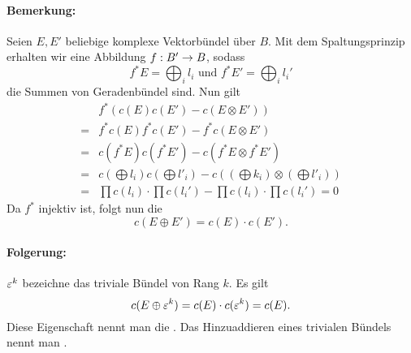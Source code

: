 \paragraph{Bemerkung:}
Seien $E,E'$ beliebige komplexe Vektorbündel über $B$. Mit dem Spaltungsprinzip erhalten wir eine Abbildung $f : B' \overset{}{\rightarrow} B$, sodass
\[ f^* E = \bigoplus_i l_i \text{ und } f^* E' = \bigoplus_i l_i'  \]
die Summen von Geradenbündel sind. Nun gilt
\begin{align*}
&f^*(
c(E) c(E') - c(E \otimes E')
)\\
=& f^*c(E) f^*c(E') - f^*c(E\otimes E')\\
=& c(f^*E) c(f^*E') - c(f^*E \otimes f^*E')\\
=&c(\bigoplus l_i) c(\bigoplus l'_i) - c((\bigoplus k_i) \otimes (\bigoplus l'_i))\\
=& \prod c(l_i) \cdot \prod c(l_i') - \prod c(l_i) \cdot \prod c(l_i') = 0
\end{align*}
Da $f^*$ injektiv ist, folgt nun die 
\[ c(E\oplus E') = c(E) \cdot c(E'). \]

\paragraph{Folgerung:}
$\varepsilon^k$ bezeichne das triviale Bündel von Rang $k$. Es gilt
\[ c(E\oplus \varepsilon^k) = c(E) \cdot c(\varepsilon^k) = c(E). \]
Diese Eigenschaft nennt man die . Das Hinzuaddieren eines trivialen Bündels nennt man .